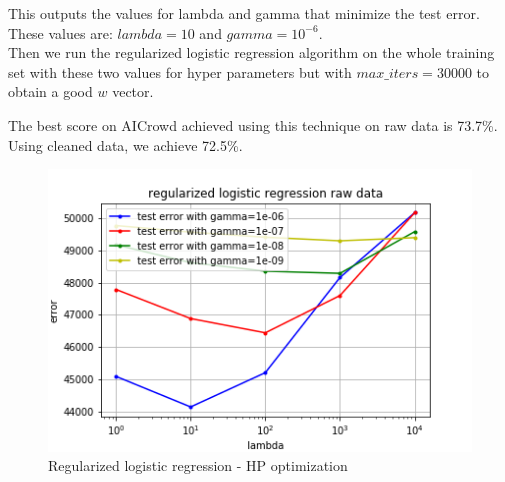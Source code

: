 \documentclass[11pt, a4paper, twocolumn]{article}
\begin{document}
This outputs the values for lambda and gamma that minimize the test error. These values are:
$lambda = 10$ and $gamma = 10^{-6}$.\\
Then we run the regularized logistic regression algorithm on the whole training set with these two values for hyper parameters but with $max\_iters = 30000$ to obtain a good $w$ vector.

The best score on AICrowd achieved using this technique on raw data is 73.7\%. Using cleaned data, we achieve 72.5\%.
\begin{figure}[h!]
  \includegraphics[width=\linewidth]{plots/raw_data_reg_log_regr.png}
  \caption{Regularized logistic regression - HP optimization}
  \label{fig:raw_reg_log_regr}
\end{figure}
\end{document}
